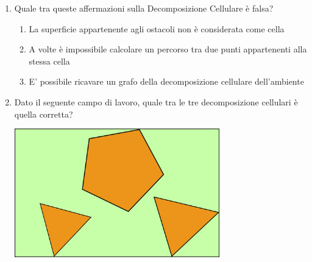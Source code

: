 \documentclass[8pt]{book}
\begin{document}
\begin{enumerate}
\item Quale tra queste affermazioni sulla Decomposizione Cellulare è falsa?

\begin{enumerate}
\def\labelenumi{\alph{enumi}.}
\item
  La superficie appartenente agli ostacoli non è considerata come cella
\item
  A volte è impossibile calcolare un percorso tra due punti appartenenti alla stessa cella
\item
  E' possibile ricavare un grafo della decomposizione cellulare dell'ambiente
\end{enumerate}

\item Dato il seguente campo di lavoro, quale tra le tre decomposizione cellulari è quella corretta?

\includegraphics[width=0.70000\textwidth]{img/cellDec_es.png}\\[2\baselineskip]


\end{enumerate}
\end{document}
